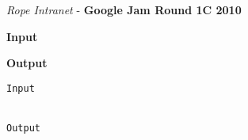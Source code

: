 \begin{solution}
	
	\begin{lstlisting}[language=c++, caption="Store credit c++ solution"]


	\end{lstlisting}
\end{solution}



\begin{problem}{\textit{Rope Intranet} - \textbf{Google Jam Round 1C 2010}}




\textbf{Input}


\textbf{Output}


\begin{framed}
	\begin{verbatim}
Input 


Output 

	\end{verbatim}
\end{framed}

\end{problem}

\begin{solution}
	
	\begin{lstlisting}[language=c++, caption="Store credit c++ solution"]


	\end{lstlisting}
\end{solution}